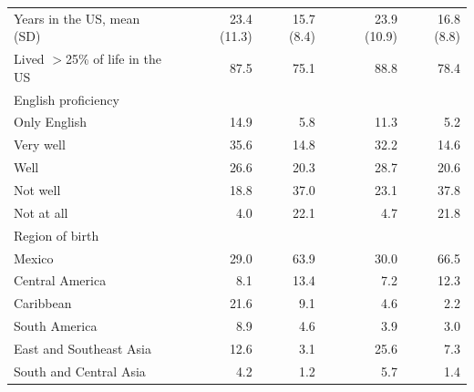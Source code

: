 \begin{landscape}
\begin{ThreePartTable}
\begin{longtable}[t]{lrrrrrr}
\hspace{1em}Years in the US, mean (SD) &  & 23.4 (11.3) & 15.7 (8.4) &  & 23.9 (10.9) & 16.8 (8.8)\\
\hspace{1em}Lived $>$25\% of life in the US &  & 87.5 & 75.1 &  & 88.8 & 78.4\\
\hspace{1em}English proficiency &  &  &  &  &  & \\
\hspace{1em}\hspace{1em}Only English &  & 14.9 & 5.8 &  & 11.3 & 5.2\\
\hspace{1em}\hspace{1em}Very well &  & 35.6 & 14.8 &  & 32.2 & 14.6\\
\hspace{1em}\hspace{1em}Well &  & 26.6 & 20.3 &  & 28.7 & 20.6\\
\hspace{1em}\hspace{1em}Not well &  & 18.8 & 37.0 &  & 23.1 & 37.8\\
\hspace{1em}\hspace{1em}Not at all &  & 4.0 & 22.1 &  & 4.7 & 21.8\\
\hspace{1em}Region of birth &  &  &  &  &  & \\
\hspace{1em}\hspace{1em}Mexico &  & 29.0 & 63.9 &  & 30.0 & 66.5\\
\hspace{1em}\hspace{1em}Central America &  & 8.1 & 13.4 &  & 7.2 & 12.3\\
\hspace{1em}\hspace{1em}Caribbean &  & 21.6 & 9.1 &  & 4.6 & 2.2\\
\hspace{1em}\hspace{1em}South America &  & 8.9 & 4.6 &  & 3.9 & 3.0\\
\hspace{1em}\hspace{1em}East and Southeast Asia &  & 12.6 & 3.1 &  & 25.6 & 7.3\\
\hspace{1em}\hspace{1em}South and Central Asia &  & 4.2 & 1.2 &  & 5.7 & 1.4\\

\end{longtable}
\end{ThreePartTable}
\end{landscape}
